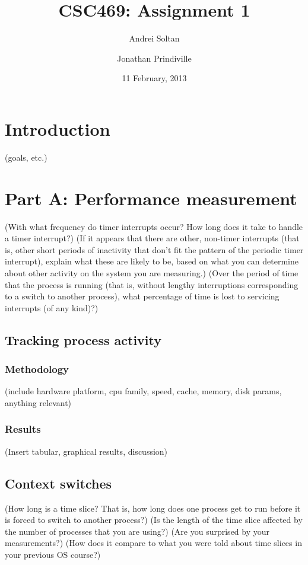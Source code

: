 \documentclass{article}
\author{Andrei Soltan \and Jonathan Prindiville}
\title{CSC469: Assignment 1}
\date{11 February, 2013}
\begin{document}
\maketitle

\tableofcontents

\newpage
\section{Introduction}
(goals, etc.)

\newpage
\section{Part A: Performance measurement}
(With what frequency do timer interrupts occur? How long does it take to handle a timer interrupt?)
(If it appears that there are other, non-timer interrupts (that is, other short periods of inactivity that don't fit the pattern of the periodic timer interrupt), explain what these are likely to be, based on what you can determine about other activity on the system you are measuring.)
(Over the period of time that the process is running (that is, without lengthy interruptions corresponding to a switch to another process), what percentage of time is lost to servicing interrupts (of any kind)?)

\subsection{Tracking process activity}
\subsubsection{Methodology}
(include hardware platform, cpu family, speed, cache, memory, disk params, anything relevant)
\subsubsection{Results}
(Insert tabular, graphical results, discussion)

\subsection{Context switches}
(How long is a time slice? That is, how long does one process get to run before it is forced to switch to another process?)
(Is the length of the time slice affected by the number of processes that you are using?)
(Are you surprised by your measurements?)
(How does it compare to what you were told about time slices in your previous OS course?)
\end{document}
